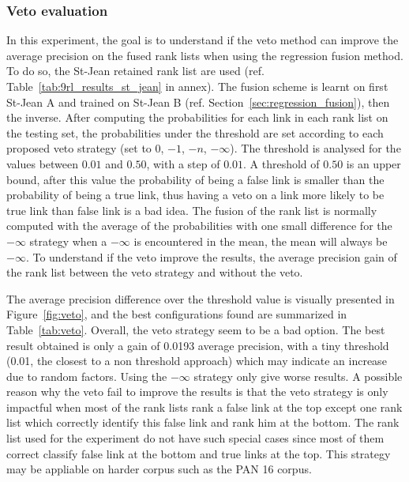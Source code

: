 \subsubsection{Veto evaluation}

In this experiment, the goal is to understand if the veto method can improve the average precision on the fused rank lists when using the regression fusion method.
To do so, the St-Jean retained rank list are used (ref. Table~\ref{tab:9rl_results_st_jean} in annex).
The fusion scheme is learnt on first St-Jean A and trained on St-Jean B (ref. Section~\ref{sec:regression_fusion}), then the inverse.
After computing the probabilities for each link in each rank list on the testing set, the probabilities under the threshold are set according to each proposed veto strategy (set to $0$, $-1$, $-n$, $-\infty$).
The threshold is analysed for the values between $0.01$ and $0.50$, with a step of $0.01$.
A threshold of $0.50$ is an upper bound, after this value the probability of being a false link is smaller than the probability of being a true link, thus having a veto on a link more likely to be true link than false link is a bad idea.
The fusion of the rank list is normally computed with the average of the probabilities with one small difference for the $-\infty$ strategy when a $-\infty$ is encountered in the mean, the mean will always be $-\infty$.
To understand if the veto improve the results, the average precision gain of the rank list between the veto strategy and without the veto.

The average precision difference over the threshold value is visually presented in Figure~\ref{fig:veto}, and the best configurations found are summarized in Table~\ref{tab:veto}.
Overall, the veto strategy seem to be a bad option.
The best result obtained is only a gain of 0.0193 average precision, with a tiny threshold (0.01, the closest to a non threshold approach) which may indicate an increase due to random factors.
Using the $-\infty$ strategy only give worse results.
A possible reason why the veto fail to improve the results is that the veto strategy is only impactful when most of the rank lists rank a false link at the top except one rank list which correctly identify this false link and rank him at the bottom.
The rank list used for the experiment do not have such special cases since most of them correct classify false link at the bottom and true links at the top.
This strategy may be appliable on harder corpus such as the PAN 16 corpus.

